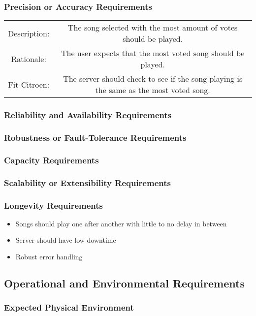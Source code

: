 \documentclass[12pt, titlepage]{article}
\begin{document}
\subsubsection{Precision or Accuracy Requirements}
\begin{center}
\begin{tabular}{| c | c | }
\hline
Description: &The song selected with the most amount of votes should be played.\\ 
Rationale: &The user expects that the most voted song should be played.\\
Fit Citroen: & The server should check to see if the song playing is the same as the most voted song. \\
\hline
\end{tabular}
\end{center}
\subsubsection{Reliability and Availability Requirements}
\subsubsection{Robustness or Fault-Tolerance Requirements}
\subsubsection{Capacity Requirements}
\subsubsection{Scalability or Extensibility Requirements}
\subsubsection{Longevity Requirements}
\begin{itemize}
\item Songs should play one after another with little to no delay in between
\item Server should have low downtime
\item Robust error handling
\end{itemize}

\subsection{Operational and Environmental Requirements}
\subsubsection{Expected Physical Environment}
\end{document}
